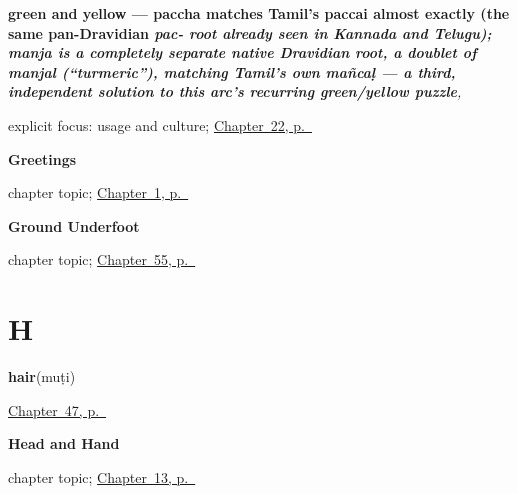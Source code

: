 \noindent\begin{minipage}[t]{\linewidth}
\raggedright
\textbf{green and yellow — paccha matches Tamil's paccai almost exactly (the same pan-Dravidian \emph{pac- root already seen in Kannada and Telugu); manja is a completely separate native Dravidian root, a doublet of manjal (\textquotedblleft{}turmeric\textquotedblright{}), matching Tamil's own mañcaḷ — a third, independent solution to this arc's recurring green/yellow puzzle}}\enspace\emph{, }\par
\footnotesize explicit focus: usage and culture; \hyperref[ch:ml-green-and-yellow]{Chapter~22, p.~\pageref*{ch:ml-green-and-yellow}}
\end{minipage}\par\smallskip

\noindent\begin{minipage}[t]{\linewidth}
\raggedright
\textbf{Greetings}\par
\footnotesize chapter topic; \hyperref[ch:greetings]{Chapter~1, p.~\pageref*{ch:greetings}}
\end{minipage}\par\smallskip

\noindent\begin{minipage}[t]{\linewidth}
\raggedright
\textbf{Ground Underfoot}\par
\footnotesize chapter topic; \hyperref[ch:ml-ground-underfoot]{Chapter~55, p.~\pageref*{ch:ml-ground-underfoot}}
\end{minipage}\par\smallskip

\section*{H}

\noindent\begin{minipage}[t]{\linewidth}
\raggedright
\textbf{hair}\enspace\emph{}\enspace(muṭi)\par
\footnotesize \hyperref[ch:ml-body-more]{Chapter~47, p.~\pageref*{ch:ml-body-more}}
\end{minipage}\par\smallskip

\noindent\begin{minipage}[t]{\linewidth}
\raggedright
\textbf{Head and Hand}\par
\footnotesize chapter topic; \hyperref[ch:ml-head-and-hand]{Chapter~13, p.~\pageref*{ch:ml-head-and-hand}}
\end{minipage}\par\smallskip

